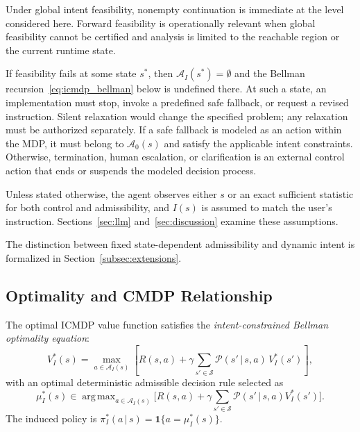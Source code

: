 \documentclass[journal]{IEEEtran}
\theoremstyle{definition}
\newcommand{\cS}{\mathcal{S}}
\newcommand{\cA}{\mathcal{A}}
\newcommand{\cP}{\mathcal{P}}
\newcommand{\argmax}{\operatorname{arg\,max}}
\newcommand{\given}{\,\vert\,}
\begin{document}
Under global intent feasibility, nonempty continuation is immediate at the
level considered here. Forward feasibility is operationally relevant when
global feasibility cannot be certified and analysis is limited to the
reachable region or the current runtime state.

If feasibility fails at some state $s^*$, then $\cA_I(s^*) = \emptyset$
and the Bellman recursion~\eqref{eq:icmdp_bellman} below is undefined there.
At such a state, an implementation must stop, invoke a predefined safe
fallback, or request a revised instruction. Silent relaxation would change
the specified problem; any relaxation must be authorized separately.
If a safe fallback is modeled as an action within the MDP, it must
belong to $\cA_0(s)$ and satisfy the applicable intent constraints. Otherwise,
termination, human escalation, or clarification is an external control action
that ends or suspends the modeled decision process.

Unless stated otherwise, the agent observes either $s$ or an exact sufficient
statistic for both control and admissibility, and $I(s)$ is assumed to match
the user's instruction. Sections~\ref{sec:llm} and~\ref{sec:discussion}
examine these assumptions.

The distinction between fixed state-dependent admissibility and dynamic intent
is formalized in Section~\ref{subsec:extensions}.

\subsection{Optimality and CMDP Relationship}
\label{subsec:optimality}

The optimal ICMDP value function satisfies the \emph{intent-constrained
Bellman optimality equation}:
\begin{equation}
  V_I^*(s) = \max_{a \in \cA_I(s)}\!\left[R(s,a) + \gamma
    \sum_{s' \in \cS} \cP(s' \given s, a)\, V_I^*(s')\right],
  \label{eq:icmdp_bellman}
\end{equation}
with an optimal deterministic admissible decision rule selected as
\begin{equation}
  \mu_I^*(s) \in \argmax_{a \in \cA_I(s)}\bigl[R(s,a)+\gamma
    \sum_{s' \in \cS} \cP(s' \given s, a)V_I^*(s')\bigr].
  \label{eq:icmdp_optpol}
\end{equation}
The induced policy is
$\pi_I^*(a\given s)=\mathbf{1}\{a=\mu_I^*(s)\}$.
\end{document}
